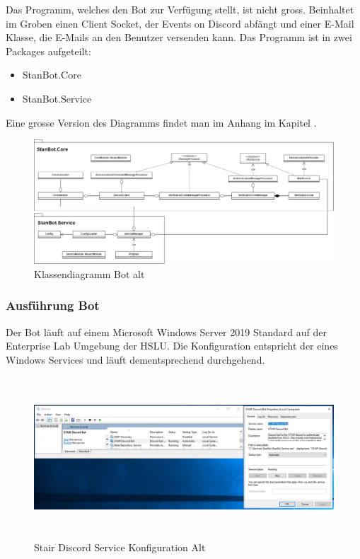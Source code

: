 \documentclass[a4paper, table]{article}
\begin{document}
Das Programm, welches den Bot zur Verfügung stellt, ist nicht gross. 
Beinhaltet im Groben einen Client Socket, der Events on Discord abfängt und einer E-Mail Klasse, die E-Mails an den Benutzer versenden kann. 
Das Programm ist in zwei Packages aufgeteilt:
\begin{itemize}
    \item StanBot.Core
    \item StanBot.Service
\end{itemize}
Eine grosse Version des Diagramms findet man im Anhang im Kapitel .
\clearpage

\begin{figure}[ht]
    \centering
    \hspace*{-1.5cm}
    \includegraphics[width=1.2\textwidth]{img/Klassendiagramm_Bot_alt.png}
    \caption{Klassendiagramm Bot alt}
    \label{fig:Klassendiagramm_Bot_alt}
\end{figure}

\subsubsection{Ausführung Bot}
Der Bot läuft auf einem Microsoft Windows Server 2019 Standard auf der Enterprise Lab Umgebung der HSLU. 
Die Konfiguration entspricht der eines Windows Services und läuft dementsprechend durchgehend.

\begin{figure}[hb]
    \centering
    \hspace*{-2.5cm}
    \includegraphics[width=1.3\textwidth,height=6cm]{img/Discord_Bot_old_service_configuration.png}
    \caption{Stair Discord Service Konfiguration Alt}
    \label{fig:bot-service-configuration-old}
\end{figure}
\clearpage
\end{document}
